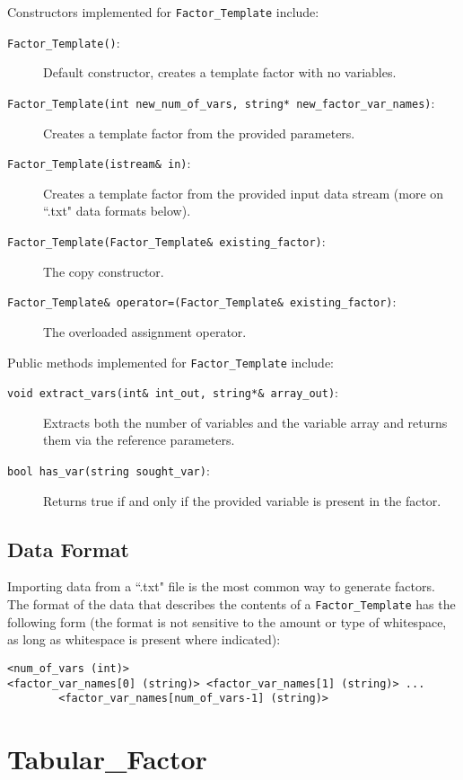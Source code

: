\documentclass{article}
\begin{document}
Constructors implemented for \texttt{Factor\_Template} include:

\begin{description}
\item[\texttt{Factor\_Template()}:] Default constructor, creates a template factor with no variables.
\item[\texttt{Factor\_Template(int new\_num\_of\_vars, string* new\_factor\_var\_names)}:] Creates a template factor from the provided parameters.
\item[\texttt{Factor\_Template(istream\& in)}:] Creates a template factor from the provided input data stream (more on ``.txt" data formats below). 
\item[\texttt{Factor\_Template(Factor\_Template\& existing\_factor)}:] The copy constructor.
\item[\texttt{Factor\_Template\& operator=(Factor\_Template\& existing\_factor)}:] The overloaded assignment operator.
\end{description}

Public methods implemented for \texttt{Factor\_Template} include:

\begin{description}
\item[\texttt{void extract\_vars(int\& int\_out, string*\& array\_out)}:] Extracts both the number of variables and the variable array and returns them via the reference parameters.
\item[\texttt{bool has\_var(string sought\_var)}:] Returns true if and only if the provided variable is present in the factor.
\end{description}

\subsection{Data Format}

Importing data from a ``.txt" file is the most common way to generate factors. The format of the data that describes the contents of a \texttt{Factor\_Template} has the following form (the format is not sensitive to the amount or type of whitespace, as long as whitespace is present where indicated): 
\begin{verbatim}
<num_of_vars (int)>
<factor_var_names[0] (string)> <factor_var_names[1] (string)> ... 
        <factor_var_names[num_of_vars-1] (string)>
\end{verbatim}




\section{Tabular\_Factor}
\end{document}
